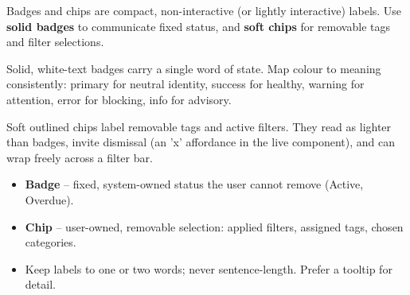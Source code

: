 
Badges and chips are compact, non-interactive (or lightly interactive) labels. Use \textbf{solid badges} to communicate fixed status, and \textbf{soft chips} for removable tags and filter selections.

\vspace{2mm}


\quad{}\quad{}\quad{}\quad{}

\vspace{2mm}
{\small\color{muted} Solid, white-text badges carry a single word of state. Map colour to meaning consistently: primary for neutral identity, success for healthy, warning for attention, error for blocking, info for advisory.}

\vspace{5mm}


\quad{}\quad{}\quad{}

\vspace{2mm}
{\small\color{muted} Soft outlined chips label removable tags and active filters. They read as lighter than badges, invite dismissal (an 'x' affordance in the live component), and can wrap freely across a filter bar.}

\vspace{5mm}


\begin{itemize}[leftmargin=5mm,itemsep=1mm]
  \item \textbf{Badge} -- fixed, system-owned status the user cannot remove (Active, Overdue).
  \item \textbf{Chip} -- user-owned, removable selection: applied filters, assigned tags, chosen categories.
  \item Keep labels to one or two words; never sentence-length. Prefer a tooltip for detail.
\end{itemize}

\clearpage
